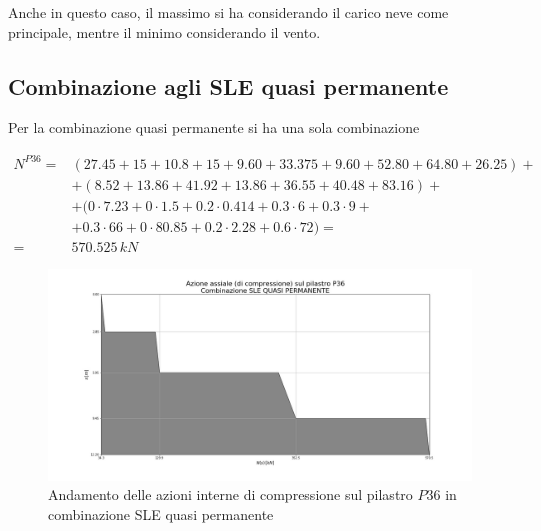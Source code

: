 Anche in questo caso, il massimo si ha considerando il carico neve come principale, mentre il minimo considerando il vento.

\subsection{Combinazione agli SLE quasi permanente}

Per la combinazione quasi permanente si ha una sola combinazione

\begin{align*}
	N^{P36} =&(27.45 + 15 +10.8 + 15+9.60 + 33.375+9.60+52.80+64.80+26.25)+\\
	&+(8.52+13.86+41.92+13.86+36.55+40.48+83.16)+\\
	&+(0\cdot7.23+0\cdot1.5+0.2\cdot0.414+0.3\cdot6+0.3\cdot9+\\
	&+0.3\cdot66+0\cdot80.85+0.2\cdot2.28+0.6\cdot72) =\\
	=& 570.525\,kN
\end{align*}

\begin{figure}
	\centering
	\includegraphics[width=.8\textwidth]{../../export/img/P36_axialLoad_sleQP}
	\caption{Andamento delle azioni interne di compressione sul pilastro $P36$ in combinazione SLE quasi permanente}
	\label{fig:P36axialLoad_sleQP}
\end{figure}

